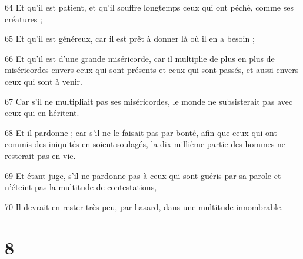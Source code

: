 \par 64 Et qu'il est patient, et qu'il souffre longtemps ceux qui ont péché, comme ses créatures ;
\par 65 Et qu'il est généreux, car il est prêt à donner là où il en a besoin ;
\par 66 Et qu'il est d'une grande miséricorde, car il multiplie de plus en plus de miséricordes envers ceux qui sont présents et ceux qui sont passés, et aussi envers ceux qui sont à venir.
\par 67 Car s'il ne multipliait pas ses miséricordes, le monde ne subsisterait pas avec ceux qui en héritent.
\par 68 Et il pardonne ; car s'il ne le faisait pas par bonté, afin que ceux qui ont commis des iniquités en soient soulagés, la dix millième partie des hommes ne resterait pas en vie.
\par 69 Et étant juge, s'il ne pardonne pas à ceux qui sont guéris par sa parole et n'éteint pas la multitude de contestations,
\par 70 Il devrait en rester très peu, par hasard, dans une multitude innombrable.

\chapter{8}

